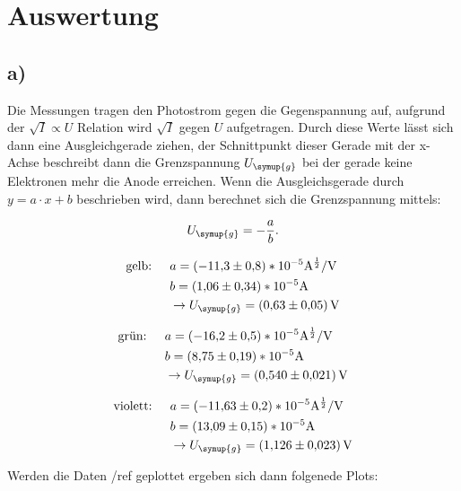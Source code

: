 \newpage
\section{Auswertung}
    \subsection{a)}
Die Messungen tragen den Photostrom gegen die Gegenspannung auf, aufgrund der $\sqrt{I} \propto  U$ Relation wird $\sqrt{I} $ gegen $  U$
aufgetragen. Durch diese Werte lässt sich dann eine Ausgleichgerade ziehen, der Schnittpunkt dieser Gerade mit der x-Achse beschreibt dann die 
Grenzspannung $U_{\symup{g}}$ bei der gerade keine Elektronen mehr die Anode erreichen. 
Wenn die Ausgleichsgerade durch $y = a \cdot x +b$ beschrieben wird, dann berechnet sich die Grenzspannung mittels: 

\begin{equation}
    U_{\symup{g}} = -  \frac{a}{b}.
\end{equation}

\begin{align}
    \text{gelb:  }   \quad     &a = (-\num{11.3}\pm \num{0.8})*10^{-5} \si{\ampere^{\frac{1}{2}}\per\volt}\\
                    &b = (\num{1.06}\pm \num{0.34})*10^{-5} \si{\ampere}\\
                    & \rightarrow U_{\symup{g}} = \SI{0.63 \pm 0.05}{\volt}
\end{align}         

\begin{align}
    \text{grün:  }   \quad     &a = (-\num{16.2}\pm \num{0.5})*10^{-5} \si{\ampere^{\frac{1}{2}}\per\volt}\\
                        &b = (\num{8.75}\pm \num{0.19})*10^{-5} \si{\ampere}\\
                        & \rightarrow U_{\symup{g}} = \SI{0.54 \pm 0.021}{\volt}
\end{align}

\begin{align}
    \text{violett:  }  \quad      &a = (-\num{11.63}\pm \num{0.2})*10^{-5} \si{\ampere^{\frac{1}{2}}\per\volt}\\
                           &b = (\num{13.09}\pm \num{0.15})*10^{-5} \si{\ampere}\\
                           & \rightarrow U_{\symup{g}} = \SI{1.126 \pm 0.023}{\volt}
\end{align}

Werden die Daten /ref{} geplottet ergeben sich dann folgenede Plots:

